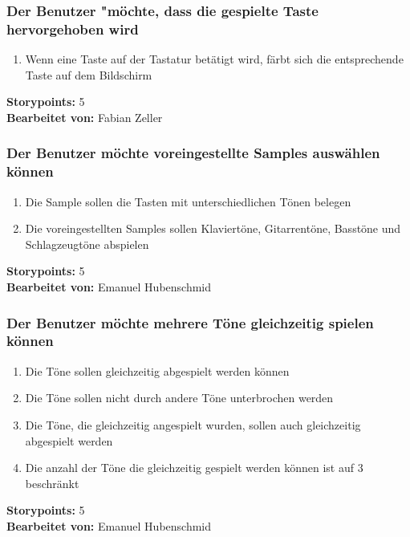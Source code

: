 \subsubsection{Der Benutzer "möchte, dass die gespielte Taste hervorgehoben wird}

\begin{enumerate}
 \item Wenn eine Taste auf der Tastatur betätigt wird, färbt sich die entsprechende Taste auf dem 
Bildschirm
\end{enumerate}

\textbf{Storypoints:} 5 \\
\textbf{Bearbeitet von: } Fabian Zeller \\


\subsubsection{Der Benutzer möchte voreingestellte Samples auswählen können}

\begin{enumerate}
 \item Die Sample sollen die Tasten mit unterschiedlichen Tönen belegen
 \item Die voreingestellten Samples sollen Klaviertöne, Gitarrentöne, Basstöne und Schlagzeugtöne 
abspielen
\end{enumerate}

\textbf{Storypoints:} 5 \\
\textbf{Bearbeitet von: } Emanuel Hubenschmid \\


\subsubsection{Der Benutzer möchte mehrere Töne gleichzeitig spielen können}

\begin{enumerate}
 \item Die Töne sollen gleichzeitig abgespielt werden können
 \item Die Töne sollen nicht durch andere Töne unterbrochen werden
 \item Die Töne, die gleichzeitig angespielt wurden, sollen auch gleichzeitig abgespielt werden
 \item Die  anzahl der Töne die gleichzeitig gespielt werden können ist auf 3 beschränkt
\end{enumerate}

\textbf{Storypoints:} 5 \\
\textbf{Bearbeitet von: } Emanuel Hubenschmid \\


